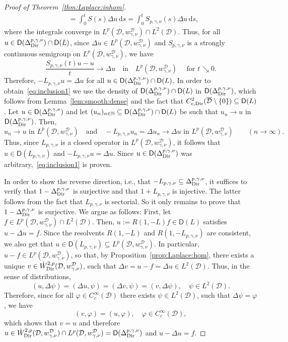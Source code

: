 \documentclass[12pt,a4paper, reqno]{amsart}
\theoremstyle{plain}
\theoremstyle{definition}
\theoremstyle{remark}
\numberwithin{equation}{section}
\newcommand{\1}{\mathbbm{1}}
\newcommand{\N}{\ensuremath{\mathbb{N}}}
\newcommand{\calD}{\ensuremath{\mathcal{D}}}
\newcommand{\sfD}{\ensuremath{\mathsf{D}}}
\newcommand{\Dir}{\textup{Dir}}
\begin{document}
\begin{proof}[Proof of Theorem~\ref{thm:Laplace:inhom}]
\begin{align*}
&=
\int_0^t S(s) \Delta u\,\mathrm{d}s
=
\int_0^t S_{p,\gamma,\nu}(s) \Delta u\,\mathrm{d}s,
\end{align*}
where the integrals converge in $L^p(\calD,w_{\gamma,\nu}^{\calD})\cap L^2(\calD)$.
Thus,
for all $u\in \sfD(\Delta_\Dir^{p,\gamma,\nu}) \cap \sfD(L)$,
since $\Delta u\in L^p(\calD,w_{\gamma,\nu}^\calD)$ and $S_{p,\gamma,\nu}$ is a strongly continuous semigroup on $L^p(\calD,w^\calD_{\gamma,\nu})$, we have 
\[
\frac{S_{p,\gamma,\nu}(t)u - u}{t}
\longrightarrow 
\Delta u
\quad \text{in} \quad L^p(\calD,w_{\gamma,\nu}^\calD)\quad  \text{ for } t\searrow  0.
\]
Therefore, 
$-L_{p,\gamma,\nu}u = \Delta u$ 
for all $u\in \sfD(\Delta_\Dir^{p,\gamma,\nu}) \cap \sfD(L)$.
In order to obtain~\eqref{eq:inclusion1} we use the density of $\sfD(\Delta_\Dir^{p,\gamma,\nu}) \cap \sfD(L)$ in $\sfD(\Delta_\Dir^{p,\gamma,\nu})$, which follows from Lemma~\ref{lem:smooth:dense} and the fact that 
$C_{c,\Dir}^2(\overline{\calD}\setminus\{0\})\subseteq \sfD(L)$.
Let $u\in \sfD(\Delta_\Dir^{p,\gamma,\nu})$ and let $(u_n)_{n\in\N}\subseteq \sfD(\Delta_\Dir^{p,\gamma,\nu}) \cap \sfD(L)$ be such that $u_n\to u$ in $\sfD(\Delta_\Dir^{p,\gamma,\nu})$. Then, 
\[
u_n\to u \text{ in } L^p(\calD,w_{\gamma,\nu}^\calD) \quad \text{and}\quad -L_{p,\gamma,\nu} u_n=\Delta u_n\to \Delta u\text{ in } L^p(\calD,w_{\gamma,\nu}^\calD)\qquad (n\to\infty).
\]
Thus, since $L_{p,\gamma,\nu}$ is a closed operator in $L^p(\calD,w_{\gamma,\nu}^\calD)$, it follows that $u\in \sfD(L_{p,\gamma,\nu})$ and $-L_{p,\gamma,\nu}u=\Delta u$. Since $u\in\sfD(\Delta_\Dir^{p,\gamma,\nu})$ was arbitrary,~\eqref{eq:inclusion1} is proven.

In order to show the reverse direction, i.e., that $-L_{p,\gamma,\nu}\subseteq \Delta_\Dir^{p,\gamma,\nu}$, it suffices to verify that $1-\Delta_\Dir^{p,\gamma,\nu}$ is surjective and that $1+L_{p,\gamma,\nu}$ is injective. The latter follows from the fact that $L_{p,\gamma,\nu}$ is sectorial. 
So it only remains to prove that $1-\Delta_\Dir^{p,\gamma,\nu}$ is surjective. We argue as follows:
First, let  $f\in L^p(\calD,w_{\gamma,\nu}^\calD)\cap L^2(\calD)$. Then, $u:=R(1,-L)f\in\sfD(L)$ satisfies $u-\Delta u = f$. Since the resolvents $R(1,-L)$ and $R(1,-L_{p,\gamma,\nu})$ are consistent, we also get that $u\in\sfD(L_{p,\gamma,\nu})\subseteq L^p(\calD,w_{\gamma,\nu}^\calD)$. 
In particular, $u-f\in L^p(\calD,w_{\gamma,\nu}^\calD)$, so that, by Proposition~\ref{prop:Laplace:hom}, there exists a unique $v\in\Dot{W}^{2,p}_\Dir(\calD,w_{\gamma,\nu}^\calD)$, such that $\Delta v = u-f =\Delta u\in L^2(\calD)$. Thus, in the sense of distributions,
\[
(u,\Delta\psi) = (\Delta u,\psi) = (\Delta v,\psi) = (v,\Delta\psi), \quad \psi\in L^2(\calD).
\]
Therefore,
since for all $\varphi\in C_c^\infty(\calD)$ there exists $\psi\in L^2(\calD)$, such that $\Delta\psi=\varphi$, we have 
\[
(v,\varphi)= (u,\varphi),\quad\varphi\in C_c^\infty(\calD),
\]
which shows that $v=u$ and therefore $u\in \Dot{W}^{2,p}_\Dir(\calD,w_{\gamma,\nu}^\calD)\cap L^p(\calD,w_{\gamma,\nu}^\calD) = \sfD(\Delta_\Dir^{p,\gamma,\nu})$ and $u-\Delta u=f$.



\end{proof}
\end{document}
